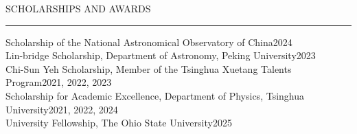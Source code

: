 \documentclass{resume} %
\renewenvironment{rSection}[1]{
\sectionskip
\textcolor{TsinghuaPurple}{\MakeUppercase{#1}}
\sectionlineskip
\hrule
\begin{list}{}{
\setlength{\leftmargin}{0em}
}
\item[]
}{
\end{list}
}
\begin{document}
\begin{rSection}{Scholarships and Awards} \itemsep -2pt
{Scholarship of the National Astronomical Observatory of China}\hfill {2024\;\;\;\;\;\;\;\;\;} \\
{Lin-bridge Scholarship, Department of Astronomy, Peking University}\hfill {2023\;\;\;\;\;\;\;\;\;}\\
{Chi-Sun Yeh Scholarship, Member of the Tsinghua Xuetang Talents Program}\hfill {2021, 2022, 2023} \\
{Scholarship for Academic Excellence, Department of Physics, Tsinghua University}\hfill {2021, 2022, 2024}\\
{University Fellowship, The Ohio State University}\hfill {2025\;\;\;\;\;\;\;\;\;}\\
\end{rSection}



\end{document}
